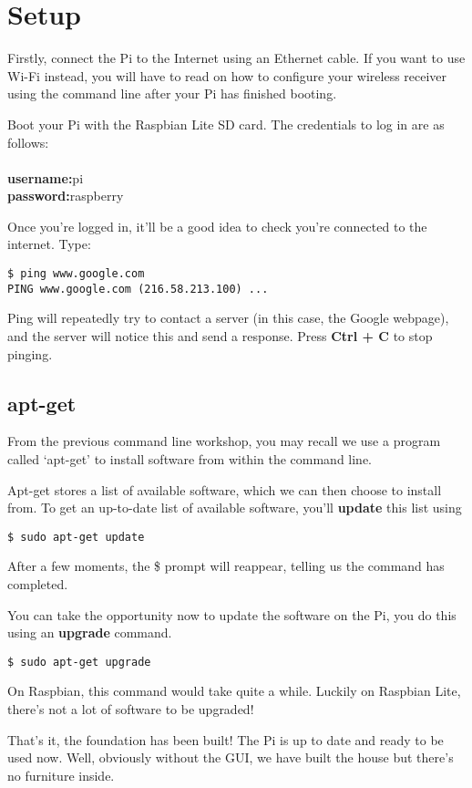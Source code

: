 \section{Setup}

	Firstly, connect the Pi to the Internet using an Ethernet cable. If you want to use Wi-Fi instead, you will have to read on how to configure your wireless receiver using the command line after your Pi has finished booting.
	
	Boot your Pi with the Raspbian Lite SD card. The credentials to log in are as follows:
	\\
	\\\textbf{username:}\hspace{2cm}pi
	\\\textbf{password:}\hspace{2cm}raspberry
	
	\vspace{10pt}
	Once you're logged in, it'll be a good idea to check you're connected to the internet. Type:

		\begin{lstlisting}[style=Terminal]
$ ping www.google.com
PING www.google.com (216.58.213.100) ...
		\end{lstlisting}

	Ping will repeatedly try to contact a server (in this case, the Google webpage), and the server will notice this and send a response. Press \textbf{Ctrl + C} to stop pinging.
	
		\subsection*{apt-get}
		
		From the previous command line workshop, you may recall we use a program called `apt-get' to install software from within the command line.
		
		Apt-get stores a list of available software, which we can then choose to install from. To get an up-to-date list of available software, you'll \textbf{update} this list using
	
		\begin{lstlisting}[style=Terminal]
$ sudo apt-get update
		\end{lstlisting}

		After a few moments, the \$ prompt will reappear, telling us the command has completed.
		
		You can take the opportunity now to update the software on the Pi, you do this using an \textbf{upgrade} command.
	
		\begin{lstlisting}[style=Terminal]
$ sudo apt-get upgrade
		\end{lstlisting}	

		On Raspbian, this command would take quite a while. Luckily on Raspbian Lite, there's not a lot of software to be upgraded!
		
	That's it, the foundation has been built! The Pi is up to date and ready to be used now. Well, obviously without the GUI, we have built the house but there's no furniture inside. 